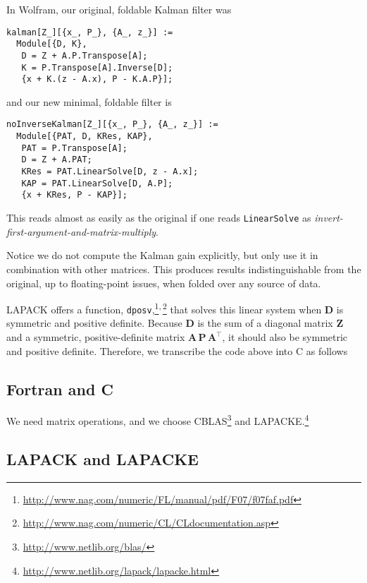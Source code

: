 \documentclass[10pt,oneside,x11names]{article}
\begin{document}
In Wolfram, our original, foldable Kalman filter was

\begin{verbatim}
kalman[Z_][{x_, P_}, {A_, z_}] :=
  Module[{D, K},
   D = Z + A.P.Transpose[A];
   K = P.Transpose[A].Inverse[D];
   {x + K.(z - A.x), P - K.A.P}];
\end{verbatim}

\noindent and our new minimal, foldable filter is

\begin{verbatim}
noInverseKalman[Z_][{x_, P_}, {A_, z_}] :=
  Module[{PAT, D, KRes, KAP},
   PAT = P.Transpose[A];
   D = Z + A.PAT;
   KRes = PAT.LinearSolve[D, z - A.x];
   KAP = PAT.LinearSolve[D, A.P];
   {x + KRes, P - KAP}];
\end{verbatim}

This reads almost as easily as the original if one reads \texttt{LinearSolve} as
\emph{invert-first-argument-and-matrix-multiply}.

Notice we do not compute the Kalman gain explicitly, but only use it in
combination with other matrices. This produces results indistinguishable from
the original, up to floating-point issues, when folded over any source of data.

LAPACK offers a function, \texttt{dposv},\footnote{\url{http://www.nag.com/numeric/FL/manual/pdf/F07/f07faf.pdf}}\textsuperscript{,}\,\footnote{\url{http://www.nag.com/numeric/CL/CLdocumentation.asp}} that solves this linear
system when \(\mathbold{D}\) is symmetric and positive definite. Because
\(\mathbold{D}\) is the sum of a diagonal matrix \(\mathbold{Z}\) and a symmetric,
positive-definite matrix \(\mathbold{A}\,\mathbold{P}\,\mathbold{A}^\intercal\),
it should also be symmetric and positive definite. Therefore, we transcribe the
code above into C as follows

\subsection{Fortran and C}
\label{sec:orgheadline17}

We need matrix operations, and we choose CBLAS\footnote{\url{http://www.netlib.org/blas/}} and LAPACKE.\footnote{\url{http://www.netlib.org/lapack/lapacke.html}}

\subsection{LAPACK and LAPACKE}
\label{sec:orgheadline20}
\end{document}
